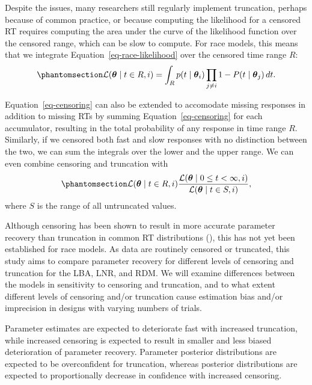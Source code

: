 \documentclass[
  stu,
  floatsintext,
  longtable,
  nolmodern,
  notxfonts,
  notimes,
  draftfirst,
  colorlinks=true,linkcolor=blue,citecolor=blue,urlcolor=blue]{apa7}
\begin{document}
Despite the issues, many researchers still regularly implement
truncation, perhaps because of common practice, or because computing the
likelihood for a censored RT requires computing the area under the curve
of the likelihood function over the censored range, which can be slow to
compute. For race models, this means that we integrate
Equation~\ref{eq-race-likelihood} over the censored time range \(R\):
\begin{equation}\phantomsection\label{eq-censoring}{
\mathcal{L}(\boldsymbol{\theta} \mid t \in R, i) = \int_{R} p(t \mid \boldsymbol{\theta}_{i}) \prod_{j \neq i}{1 - P(t \mid \boldsymbol{\theta}_{j})} \, dt.
}\end{equation}

Equation~\ref{eq-censoring} can also be extended to accomodate missing
responses in addition to missing RTs by summing
Equation~\ref{eq-censoring} for each accumulator, resulting in the total
probability of any response in time range \(R\). Similarly, if we
censored both fast and slow responses with no distinction between the
two, we can sum the integrals over the lower and the upper range. We can
even combine censoring and truncation with
\begin{equation}\phantomsection\label{eq-censoringandtruncation}{
\mathcal{L}(\boldsymbol{\theta} \mid t \in R, i) \frac{\mathcal{L}(\boldsymbol{\theta} \mid 0 \leq t < \infty, i)}{\mathcal{L}(\boldsymbol{\theta} \mid t \in S, i)},
}\end{equation} where \(S\) is the range of all untruncated values.

Although censoring has been shown to result in more accurate parameter
recovery than truncation in common RT distributions
(), this has not yet been
established for race models. As data are routinely censored or
truncated, this study aims to compare parameter recovery for different
levels of censoring and truncation for the LBA, LNR, and RDM. We will
examine differences between the models in sensitivity to censoring and
truncation, and to what extent different levels of censoring and/or
truncation cause estimation bias and/or imprecision in designs with
varying numbers of trials.

Parameter estimates are expected to deteriorate fast with increased
truncation, while increased censoring is expected to result in smaller
and less biased deterioration of parameter recovery. Parameter posterior
distributions are expected to be overconfident for truncation, whereas
posterior distributions are expected to proportionally decrease in
confidence with increased censoring.
\end{document}
